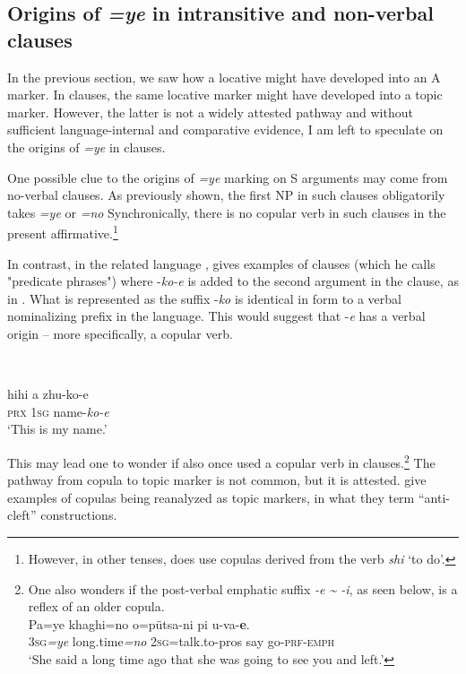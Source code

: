 \documentclass[output=paper]{LSP/langsci}
\begin{document}
\subsection{Origins of \textit{=ye} in intransitive and non-verbal clauses}\label{13-te-sec:4.2}

In the previous section, we saw how a locative might have developed into an  A marker. 
In  clauses, the same locative marker might have developed into a topic marker. 
However, the latter is not a widely attested  pathway and without sufficient language-internal and comparative evidence, I am left to speculate on the origins of \textit{=ye} in  clauses. 

One possible clue to the origins of \textit{=ye} marking on S arguments may come from no-verbal clauses. 
As previously shown, the first NP in such clauses obligatorily takes \textit{=ye} or \textit{=no} Synchronically, there is no copular verb in such clauses in the present affirmative.\footnote{However, in other tenses,  does use copulas derived from the verb \textit{shi} ‘to do’.} 

In contrast, in the related language , \citet{Giridhar1994Mao} gives examples of  clauses (which he calls "predicate phrases") where -\textit{ko-e} is added to the second argument in the clause, as in . 
What is represented as the suffix -\textit{ko} is identical in form to a verbal nominalizing prefix in the language. This would suggest that -\textit{e} has a verbal origin – more specifically, a copular verb.

\ea
{}\\
\label{13-te-ex:38}

\gll hihi a zhu-ko-e\\
\textsc{prx} \textsc{1sg} name-\textit{ko-e}\\
\glt `This is my name.'
\z

This may lead one to wonder if  also once used a copular verb in  clauses.\footnote{One also wonders if the  post-verbal emphatic suffix \textit{-e {\textasciitilde} -i}, as seen below, is a reflex of an older copula. 
\ea
{} \\
\gll Pa=ye khaghi=no o=pütsa-ni pi u-va-\textbf{e}.\\
3\textsc{sg}\textit{=ye} long.time\textit{=no} 2\textsc{sg}=talk.to-pros say go-\textsc{prf}-\textsc{emph}\\
\glt ‘She said a long time ago that she was going to see you and left.’
\z
} The pathway from copula to topic marker is not common, but it is attested. \citet[165--166]{Harrisetal1995Historical} give examples of copulas being reanalyzed as topic markers, in what they term “anti-cleft” constructions.
\end{document}
